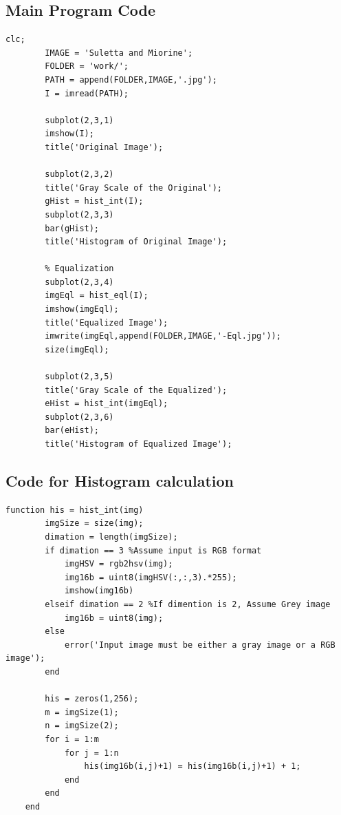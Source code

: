 \documentclass[a4paper,11pt]{article}
\begin{document}
\subsection{Main Program Code}
\lstset{language = Matlab}
    \begin{lstlisting}[basicstyle=\tiny]clc;
        IMAGE = 'Suletta and Miorine';
        FOLDER = 'work/';
        PATH = append(FOLDER,IMAGE,'.jpg');
        I = imread(PATH);
        
        subplot(2,3,1)
        imshow(I);
        title('Original Image');
        
        subplot(2,3,2)
        title('Gray Scale of the Original');
        gHist = hist_int(I);
        subplot(2,3,3)
        bar(gHist);
        title('Histogram of Original Image');
        
        % Equalization
        subplot(2,3,4)
        imgEql = hist_eql(I);
        imshow(imgEql);
        title('Equalized Image');
        imwrite(imgEql,append(FOLDER,IMAGE,'-Eql.jpg'));
        size(imgEql);
        
        subplot(2,3,5)
        title('Gray Scale of the Equalized');
        eHist = hist_int(imgEql);
        subplot(2,3,6)
        bar(eHist);
        title('Histogram of Equalized Image');
\end{lstlisting}

\subsection{Code for Histogram calculation}
\lstset{language = Matlab}
    \begin{lstlisting}[basicstyle=\tiny]
        function his = hist_int(img)
        imgSize = size(img);
        dimation = length(imgSize);
        if dimation == 3 %Assume input is RGB format
            imgHSV = rgb2hsv(img);
            img16b = uint8(imgHSV(:,:,3).*255);
            imshow(img16b)
        elseif dimation == 2 %If dimention is 2, Assume Grey image
            img16b = uint8(img);
        else
            error('Input image must be either a gray image or a RGB image');
        end
    
        his = zeros(1,256);
        m = imgSize(1);
        n = imgSize(2);
        for i = 1:m
            for j = 1:n
                his(img16b(i,j)+1) = his(img16b(i,j)+1) + 1;
            end
        end
    end
\end{lstlisting}
\end{document}
